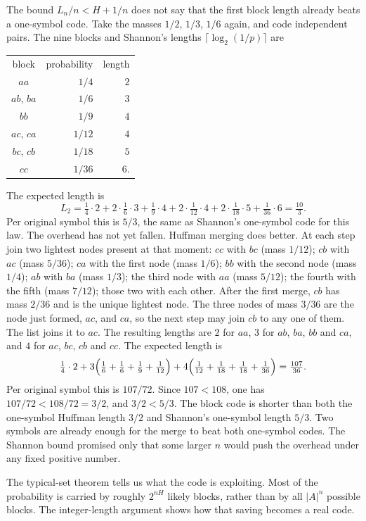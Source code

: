 The bound $L_n/n<H+1/n$ does not say that the first block length already beats a one-symbol code. Take the masses $1/2$, $1/3$, $1/6$ again, and code independent pairs. The nine blocks and Shannon's lengths $\lceil\log_2(1/p)\rceil$ are
\begin{center}
\begin{tabular}{crr}
block & probability & length\\
$aa$ & $1/4$ & $2$\\
$ab$, $ba$ & $1/6$ & $3$\\
$bb$ & $1/9$ & $4$\\
$ac$, $ca$ & $1/12$ & $4$\\
$bc$, $cb$ & $1/18$ & $5$\\
$cc$ & $1/36$ & $6$.
\end{tabular}
\end{center}
The expected length is
\[
 L_2=\tfrac14\cdot2+2\cdot\tfrac16\cdot3+\tfrac19\cdot4+2\cdot\tfrac1{12}\cdot4+2\cdot\tfrac1{18}\cdot5+\tfrac1{36}\cdot6=\tfrac{10}3.
\]
Per original symbol this is $5/3$, the same as Shannon's one-symbol code for this law. The overhead has not yet fallen. Huffman merging does better. At each step join two lightest nodes present at that moment: $cc$ with $bc$ (mass $1/12$); $cb$ with $ac$ (mass $5/36$); $ca$ with the first node (mass $1/6$); $bb$ with the second node (mass $1/4$); $ab$ with $ba$ (mass $1/3$); the third node with $aa$ (mass $5/12$); the fourth with the fifth (mass $7/12$); those two with each other. After the first merge, $cb$ has mass $2/36$ and is the unique lightest node. The three nodes of mass $3/36$ are the node just formed, $ac$, and $ca$, so the next step may join $cb$ to any one of them. The list joins it to $ac$. The resulting lengths are $2$ for $aa$, $3$ for $ab$, $ba$, $bb$ and $ca$, and $4$ for $ac$, $bc$, $cb$ and $cc$. The expected length is
\[
 \tfrac14\cdot2+3\Bigl(\tfrac16+\tfrac16+\tfrac19+\tfrac1{12}\Bigr)+4\Bigl(\tfrac1{12}+\tfrac1{18}+\tfrac1{18}+\tfrac1{36}\Bigr)=\tfrac{107}{36}.
\]
Per original symbol this is $107/72$. Since $107<108$, one has $107/72<108/72=3/2$, and $3/2<5/3$. The block code is shorter than both the one-symbol Huffman length $3/2$ and Shannon's one-symbol length $5/3$. Two symbols are already enough for the merge to beat both one-symbol codes. The Shannon bound promised only that some larger $n$ would push the overhead under any fixed positive number.

The typical-set theorem tells us what the code is exploiting. Most of the probability is carried by roughly $2^{nH}$ likely blocks, rather than by all $|A|^n$ possible blocks. The integer-length argument shows how that saving becomes a real code.

